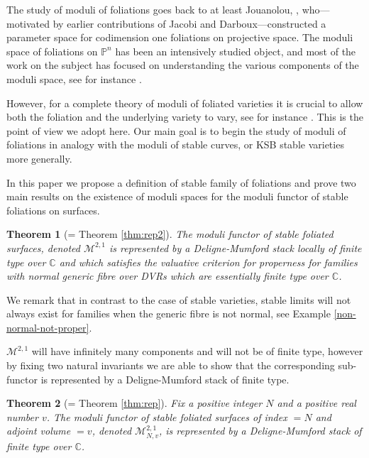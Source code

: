 \documentclass[12pt, a4paper]{amsart}
\newcounter{Theorem}
\newtheorem{theorem}{Theorem}[section]
\theoremstyle{definition}
\theoremstyle{named}
\begin{document}
The study of moduli of foliations goes back to at least Jouanolou, \cite{Jouanolou79}, who---motivated by earlier contributions of Jacobi and Darboux---constructed a parameter space for codimension one foliations on projective space.  The moduli space of foliations on $\mathbb P^n$ has been an intensively studied object, and most of the work on the subject has focused on understanding the various components of the moduli space, see for instance 
\cite{cerveau1996irreducible}. 

However, for a complete theory of moduli of foliated varieties it is crucial to allow both the foliation and the underlying variety to vary, see for instance \cite{pourcin1987deformations, gomez1988transverse}.  This is the point of view we adopt here.
Our main goal is to begin the study of moduli of foliations in analogy with the moduli of stable curves, or KSB stable varieties more generally.

\medskip


In this paper we propose a definition of stable family of foliations and prove two main results on the existence of moduli spaces for the moduli functor of stable foliations on surfaces.



\begin{theorem}[= Theorem \ref{thm:rep2}]
\label{thm_main_2}
    The moduli functor of stable foliated surfaces, denoted $\mathcal M^{2, 1}$
    is represented by a Deligne-Mumford stack locally of finite type over $\mathbb C$ and which satisfies the valuative criterion for properness for families with normal generic fibre over DVRs which are essentially finite type over $\mathbb C$.
\end{theorem}


We remark that in contrast to the case of stable varieties, stable limits will not always exist for families when the generic fibre is not normal, see Example \ref{non-normal-not-proper}.

$\mathcal M^{2, 1}$ will have infinitely many components and will not be of finite type, however by fixing two natural invariants we are able to show that the corresponding sub-functor is represented by a Deligne-Mumford stack of finite type.

\begin{theorem}[= Theorem \ref{thm:rep}]
\label{thm_main}
    Fix a positive integer $N$
    and a positive real number $v$.
The moduli functor of stable foliated surfaces of index $=N$ and adjoint volume $=v$,  denoted $\mathcal{M}^{2, 1}_{N, v}$,  is represented by a Deligne-Mumford stack of finite type over $\mathbb C$.
\end{theorem}
\end{document}
